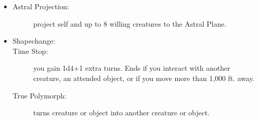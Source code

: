 \documentclass[DIV=14, paper=a4, fontsize=10pt, twocolumn, twoside]{scrartcl}
\begin{document}
\begin{itemize}[align=parleft,labelwidth=1cm]
\begin{description}
\end{description}
\renewcommand{\labelitemi}{Necro}\item
\begin{description}
 \item[Astral Projection:] project self and up to 8 willing creatures to the Astral Plane.
\end{description}
\renewcommand{\labelitemi}{Trans}\item
\begin{description} 
 \item[Shapechange:] 
 \item[Time Stop:] you gain 1d4+1 extra turns. Ends if you interact with another creature, an attended object, or if you move more than 1,000 ft. away.
 \item[True Polymorph:] turns creature or object into another creature or object.
\end{description}
\end{itemize}
\end{document}
